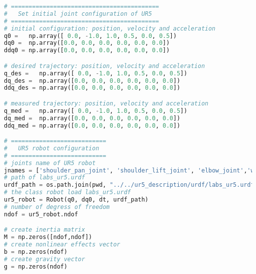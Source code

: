 \begin{lstlisting}[language=Python, caption={Move the ur5 robot end-effector using pose propotional-derivative control method \eqref{eq:pose_PD_ff} to achieve position $\mathbf{p_0}=\begin{bmatrix}  0.577 &   0.192 &   0.364 \end{bmatrix}$~m and Euler angles orientation $\gamma=\frac{\pi}{2}\sin{0.4\pi t}$.}, label={lst:pose_PD_ff}]
# ==========================================
#   Set initial joint configuration of UR5
# ==========================================
# initial configuration: position, velocity and acceleration 
q0 =   np.array([ 0.0, -1.0, 1.0, 0.5, 0.0, 0.5])
dq0 =  np.array([0.0, 0.0, 0.0, 0.0, 0.0, 0.0]) 
ddq0 = np.array([0.0, 0.0, 0.0, 0.0, 0.0, 0.0]) 

# desired trajectory: position, velocity and acceleration
q_des =   np.array([ 0.0, -1.0, 1.0, 0.5, 0.0, 0.5])
dq_des =  np.array([0.0, 0.0, 0.0, 0.0, 0.0, 0.0]) 
ddq_des = np.array([0.0, 0.0, 0.0, 0.0, 0.0, 0.0]) 

# measured trajectory: position, velocity and acceleration
q_med =   np.array([ 0.0, -1.0, 1.0, 0.5, 0.0, 0.5])
dq_med =  np.array([0.0, 0.0, 0.0, 0.0, 0.0, 0.0]) 
ddq_med = np.array([0.0, 0.0, 0.0, 0.0, 0.0, 0.0]) 

# ===========================
#   UR5 robot configuration
# ===========================
# joints name of UR5 robot
jnames = ['shoulder_pan_joint', 'shoulder_lift_joint', 'elbow_joint','wrist_1_joint', 'wrist_2_joint', 'wrist_3_joint']
# path of labs_ur5.urdf
urdf_path = os.path.join(pwd, "../../ur5_description/urdf/labs_ur5.urdf")
# the class robot load labs_ur5.urdf
ur5_robot = Robot(q0, dq0, dt, urdf_path)
# number of degress of freedom
ndof = ur5_robot.ndof

# create inertia matrix 
M = np.zeros([ndof,ndof])
# create nonlinear effects vector
b = np.zeros(ndof)
# create gravity vector
g = np.zeros(ndof)


\end{lstlisting}
